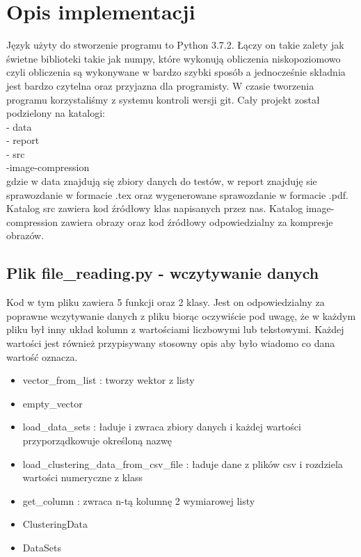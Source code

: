 \documentclass{classrep}
\begin{document}
    \section{Opis implementacji}
    {
        Język użyty do stworzenie programu to Python 3.7.2. Łączy on takie zalety jak świetne biblioteki takie jak numpy,
        które wykonują obliczenia niskopoziomowo czyli obliczenia są wykonywane w bardzo szybki sposób a jednocześnie składnia
        jest bardzo czytelna oraz przyjazna dla programisty. W czasie tworzenia programu korzystaliśmy z systemu kontroli
        wersji git. Cały projekt został podzielony na katalogi:\\
        - data\\
        - report\\
        - src\\
        -image-compression\\
        gdzie w data znajdują się zbiory danych do testów, w report znajduję sie sprawozdanie w formacie .tex oraz wygenerowane
        sprawozdanie w formacie .pdf. Katalog src zawiera kod źródłowy klas napisanych przez nas. Katalog image-compression
        zawiera obrazy oraz kod źródłowy odpowiedzialny za kompresje obrazów.
        \subsection{Plik file\_reading.py - wczytywanie danych}
        {
            Kod w tym pliku zawiera 5 funkcji oraz 2 klasy. Jest on odpowiedzialny za poprawne wczytywanie danych z pliku biorąc
            oczywiście pod uwagę, że w każdym pliku był inny układ kolumn z wartościami liczbowymi lub tekstowymi. Każdej wartości
            jest również przypisywany stosowny opis aby było wiadomo co dana wartość oznacza.
            \begin{itemize}
                \item vector\_from\_list : tworzy wektor z listy
                \item empty\_vector
                \item load\_data\_sets : ładuje i zwraca zbiory danych i każdej wartości przyporządkowuje określoną nazwę
                \item load\_clustering\_data\_from\_csv\_file : ładuje dane z plików csv i rozdziela wartości numeryczne z klass
                \item get\_column : zwraca n-tą kolumnę 2 wymiarowej listy
                \item ClusteringData
                \item DataSets
            \end{itemize}
        }
}
\end{document}
